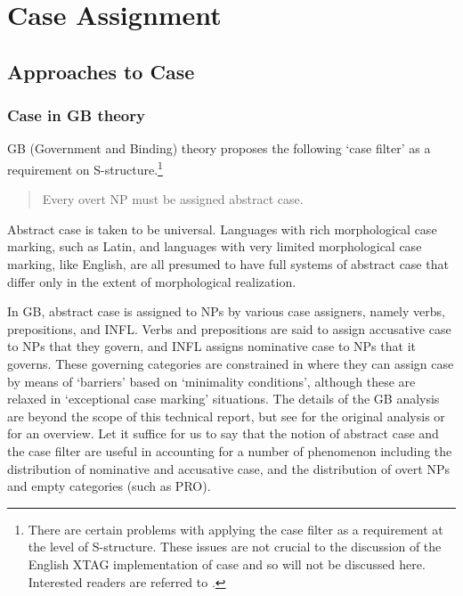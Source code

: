 
\section{Case Assignment}
\label{case-assignment}
\subsection{Approaches to Case}
\subsubsection{Case in GB theory}

GB (Government and Binding) theory proposes the following `case filter' as a
requirement on S-structure.\footnote{There are certain problems with applying
the case filter as a requirement at the level of S-structure.  These issues are
not crucial to the discussion of the English XTAG implementation of case and so
will not be discussed here.  Interested readers are referred to
\cite{lasnik-uriagereka88}.}

\begin{verse}
Every overt NP must be assigned abstract case.
\end{verse}

Abstract case is taken to be universal.  Languages with rich morphological case
marking, such as Latin, and languages with very limited morphological case
marking, like English, are all presumed to have full systems of abstract case
that differ only in the extent of morphological realization.

In GB, abstract case is assigned to NPs by various case assigners, namely
verbs, prepositions, and INFL.  Verbs and prepositions are said to assign
accusative case to NPs that they govern, and INFL assigns nominative case to
NPs that it governs.  These governing categories are constrained in where they
can assign case by means of `barriers' based on `minimality conditions',
although these are relaxed in `exceptional case marking' situations.  The
details of the GB analysis are beyond the scope of this technical report, but
see \cite{chomsky86} for the original analysis or \cite{haegeman91} for an
overview.  Let it suffice for us to say that the notion of abstract case and
the case filter are useful in accounting for a number of phenomenon including
the distribution of nominative and accusative case, and the distribution of
overt NPs and empty categories (such as PRO).

